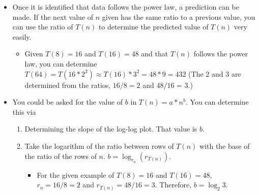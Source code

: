\documentclass{article}
\begin{document}
\begin{itemize}
    \item
        Once it is identified that data follows the power law, a prediction can be made. If the next value of $n$ given has the same ratio to a previous value, you can use the ratio of $T(n)$ to determine the predicted value of $T(n)$ very easily. 
        \begin{itemize}
            \item Given $T(8) = 16$ and $T(16) = 48$ and that $T(n)$ follows the power law, you can determine $T(64) = T(16 * 2^2) \approx T(16) * 3^2 = 48 * 9 = 432$ (The 2 and 3 are determined from the ratios, $16/8 = 2$ and $48/16$ = 3.)
        \end{itemize}
    \item
        You could be asked for the value of $b$ in $T(n) = a * n^b$. You can determine this via 
        \begin{enumerate}
            \item Determining the slope of the log-log plot. That value is $b$. 
            \item Take the logarithm of the ratio between rows of $T(n)$ with the base of the ratio of the rows of $n$. $b = \log_{r_n} (r_{T(n)})$.
                \begin{itemize}
                    \item For the given example of $T(8) = 16$ and $T(16) = 48$, $r_n = 16 / 8 = 2$ and $r_{T(n)} = 48 / 16 = 3$. Therefore, $b = \log_2 3$.
                \end{itemize}
        \end{enumerate}

\end{itemize}
\end{document}
